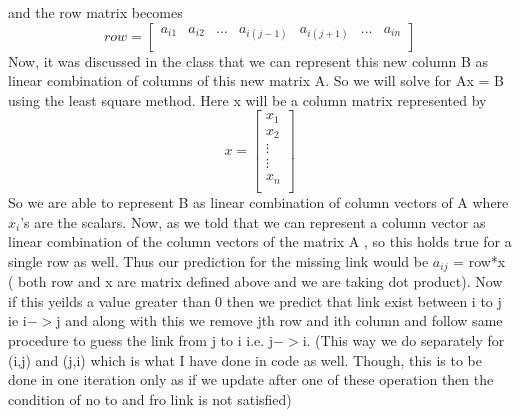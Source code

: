\documentclass{article}
\begin{document}
and the row matrix becomes\newline
\[
row =
\begin{bmatrix}
a_{i1} & a_{i2} & \dots & a_{i(j-1)} & a_{i(j+1)}& \dots & a_{in} \\
\end{bmatrix}
\]
\newline
Now, it was discussed in the class that we can represent this new column B as linear combination of columns of this new matrix A. So we will solve for Ax = B using the least square method. Here x will be a column matrix represented by 
\[
x=
\begin{bmatrix}
x_{1} \\
x_{2} \\
\vdots \\
\vdots \\
x_{n} \\
\end{bmatrix}
\]
So we are able to represent B as linear combination of column vectors of A where $x_{i}$'s are the scalars.
Now, as we told that we can represent a column vector as linear combination of the column vectors of the matrix A , so this holds true for a single row as well. Thus our prediction for the missing link would be \newline $a_{ij}$ = row*x \newline( both row and x are matrix defined above and we are taking dot product).
Now if this yeilds a value greater than 0 then we predict that link exist between i to j ie i$->$j and along with this we remove jth row and ith column and follow same procedure to guess the link from j to i i.e. j$->$i. (This way we do separately for (i,j) and (j,i) which is what I have done in code as well. Though, this is to be done in one iteration only as if we update after one of these operation then the condition of no to and fro link is not satisfied)
\end{document}
